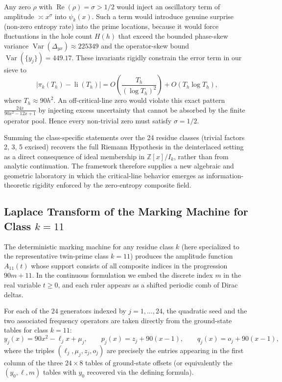 \documentclass[11pt,a4paper]{article}
\begin{document}
Any zero \(\rho\) with \(\operatorname{Re}(\rho)=\sigma>1/2\) would inject an oscillatory term of amplitude \(\asymp x^\sigma\) into \(\psi_k(x)\). Such a term would introduce genuine surprise (non-zero entropy rate) into the prime locations, because it would force fluctuations in the hole count \(H(h)\) that exceed the bounded phase-skew variance \(\operatorname{Var}(\Delta_{yx})\approx225349\) and the operator-skew bound \(\operatorname{Var}(\{y_j\})=449.17\). These invariants rigidly constrain the error term in our sieve to
\[
|\pi_k(T_h)-\operatorname{li}(T_h)|=O\left(\frac{T_h}{(\log T_h)^2}\right)+O(T_h\log T_h),
\]
where \(T_h\approx90h^2\). An off-critical-line zero would violate this exact pattern \(\frac{24x}{90x^2-12x+1}\) by injecting excess uncertainty that cannot be absorbed by the finite operator pool. Hence every non-trivial zero must satisfy \(\sigma=1/2\).

Summing the class-specific statements over the 24 residue classes (trivial factors 2, 3, 5 excised) recovers the full Riemann Hypothesis in the deinterlaced setting as a direct consequence of ideal membership in \(\mathbb{Z}[x]/I_k\), rather than from analytic continuation. The framework therefore supplies a new algebraic and geometric laboratory in which the critical-line behavior emerges as information-theoretic rigidity enforced by the zero-entropy composite field.

\subsection{Laplace Transform of the Marking Machine for Class \(k=11\)}

The deterministic marking machine for any residue class \(k\) (here specialized to the representative twin-prime class \(k=11\)) produces the amplitude function \(A_{11}(t)\) whose support consists of all composite indices in the progression \(90m + 11\). In the continuous formulation we embed the discrete index \(m\) in the real variable \(t \ge 0\), and each ruler appears as a shifted periodic comb of Dirac deltas.

For each of the \(24\) generators indexed by \(j=1,\dots,24\), the quadratic seed and the two associated frequency operators are taken directly from the ground-state tables for class \(k=11\):
\[
y_j(x) = 90x^2 - \ell_j x + \mu_j, \qquad
p_j(x) = z_j + 90(x-1), \qquad
q_j(x) = o_j + 90(x-1),
\]
where the triples \((\ell_j, \mu_j, z_j, o_j)\) are precisely the entries appearing in the first column of the three \(24 \times 8\) tables of ground-state offsets (or equivalently the \((y_0,\ell,m)\) tables with \(y_0\) recovered via the defining formula).
\end{document}
